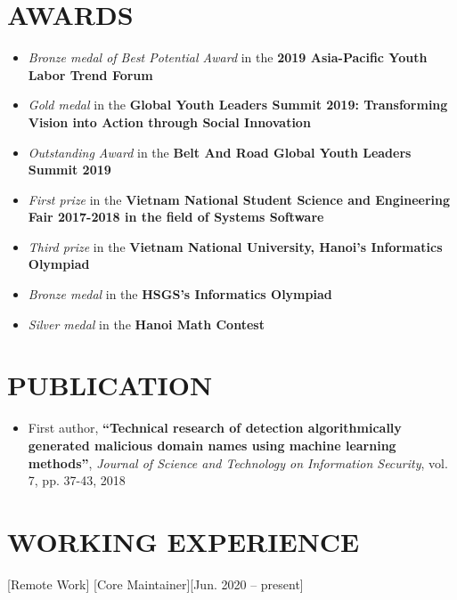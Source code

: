 \documentclass{article}
\begin{document}
\section{AWARDS}
\begin{itemize}
\item \textit{Bronze medal of Best Potential Award} in the \textbf{2019 Asia-Pacific Youth Labor Trend Forum}
\item \textit{Gold medal} in the \textbf{Global Youth Leaders Summit 2019: Transforming Vision into Action
through Social Innovation}
\item \textit{Outstanding Award} in the \textbf{Belt And Road Global Youth Leaders Summit 2019}
\item \textit{First prize} in the \textbf{Vietnam National Student Science and Engineering Fair 2017-2018 in the field of Systems Software}
\item \textit{Third prize} in the \textbf{Vietnam National University, Hanoi’s Informatics Olympiad}
\item \textit{Bronze medal} in the \textbf{HSGS’s Informatics Olympiad} 
\item \textit{Silver medal} in the \textbf{Hanoi Math Contest}
\end{itemize}


\section{PUBLICATION}
\begin{itemize}
\item First author, \textbf{“Technical research of detection algorithmically generated malicious domain names
using machine learning methods”}, \textit{Journal of Science and Technology on Information Security}, vol. 7, pp. 37-43, 2018
\end{itemize}


\section{WORKING EXPERIENCE}

[Remote Work]
[Core Maintainer][Jun. 2020 – present]
\end{document}
